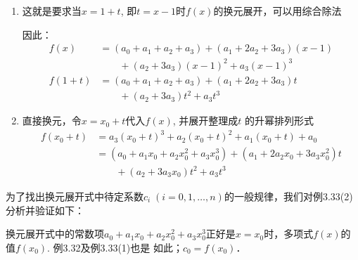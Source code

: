 \begin{solution}
\begin{enumerate}
    \item 
这就是要求当$x=1+t$, 即$t=x-1$时$f(x)$的换元展开，可以用综合除法
\begin{center}
\end{center}
因此：
\[\begin{split}
    f (x) &= (a_0+a_1 +a_2 +a_3) + (a_1 +2a_2+3a_3 ) (x-1)\\
    &\qquad +(a_2 +3a_3) (x-1)^2+a_3(x-1)^3\\
f(1+t)&=(a_0+a_1 +a_2 +a_3) +(a_1 +2a_2+3a_3)t \\
&\qquad + (a_2+3a_3) t^2+a_3t^3
\end{split}\]

\item 直接换元，令$x=x_0+t$代入$f(x)$, 并展开整理成$t$
的升幂排列形式
\[\begin{split}
    f (x_0+t) &=a_3(x_0+t)^3 +a_2(x_0+t)^2+a_1(x_0+t)+a_0\\
&=(a_0 +a_1x_0 +a_2x_0^2+a_3x_0^3) + (a_1+2a_2x_0+3a_3 x^2_0)t\\
&\qquad + (a_2+3a_3x_0) t^2+a_3t^3
\end{split} \]
\end{enumerate}
\end{solution}

为了找出换元展开式中待定系数$c_i\; (i=0, 1,\ldots,n)$的一般规律，我们对例3.33(2)分析并验证如下：

换元展开式中的常数项$a_0+a_1x_0+a_2x_0^2+a_3x_0^3$正好是$x=x_0$时，多项式$f(x)$的值$f(x_0)$. 例3.32及例3.33(1)也是 如此；$c_0=f (x_0)$．


